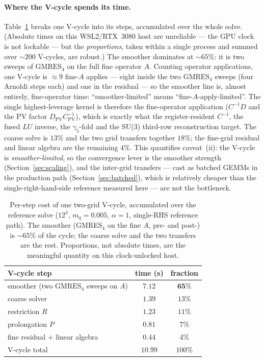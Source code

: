 \documentclass[12pt,a4paper]{article}
\newcommand{\Ddw}{D}
\newcommand{\Dpv}{D_{\mathrm{PV}}}
\newcommand{\Cpvinv}{C_{\mathrm{PV}}^{-1}}
\newcommand{\Aop}{A}
\begin{document}
\paragraph{Where the V-cycle spends its time.}
Table~\ref{tab:vctime} breaks one V-cycle into its steps, accumulated over the
whole solve. (Absolute times on this WSL2/RTX~3080 host are unreliable --- the GPU
clock is not lockable --- but the \emph{proportions}, taken within a single
process and summed over ${\sim}200$ V-cycles, are robust.) The smoother dominates
at ${\sim}65\%$: it is two sweeps of $\mathrm{GMRES}_4$ on the full fine operator
$\Aop$. Counting operator applications, one V-cycle is ${\approx}9$ fine-$\Aop$
applies --- eight inside the two $\mathrm{GMRES}_4$ sweeps (four Arnoldi steps each)
and one in the residual --- so the smoother line is, almost entirely, fine-operator
time: ``smoother-limited'' means ``fine-$\Aop$-apply-limited''. The single
highest-leverage kernel is therefore the fine-operator application ($C^{-1}\Ddw$ and
the PV factor $\Dpv\Cpvinv$), which is exactly what the register-resident $C^{-1}$,
the fused $LU$ inverse, the $\gamma_5$-fold and the SU(3) third-row reconstruction
target. The coarse solve is $13\%$ and the two grid transfers together $18\%$; the
fine-grid residual and linear algebra are the remaining $4\%$. This quantifies
caveat~(ii): the V-cycle is \emph{smoother-limited}, so the convergence lever is
the smoother strength (Section~\ref{sec:scaling}), and the inter-grid transfers ---
cast as batched GEMMs in the production path (Section~\ref{sec:batched}), which is
relatively cheaper than the single-right-hand-side reference measured here --- are
not the bottleneck.

\begin{table}[h]
\centering
\begin{tabular}{lcc}
\toprule
V-cycle step & time (s) & fraction \\
\midrule
smoother (two $\mathrm{GMRES}_4$ sweeps on $\Aop$) & $7.12$ & $\mathbf{65\%}$ \\
coarse solver                                       & $1.39$ & $13\%$ \\
restriction $R$                                     & $1.23$ & $11\%$ \\
prolongation $P$                                    & $0.81$ & $7\%$ \\
fine residual $+$ linear algebra                    & $0.44$ & $4\%$ \\
\midrule
V-cycle total                                       & $10.99$ & $100\%$ \\
\bottomrule
\end{tabular}
\caption{Per-step cost of one two-grid V-cycle, accumulated over the reference
solve ($12^4$, $m_q=0.005$, $\alpha=1$, single-RHS reference path). The smoother
(GMRES$_4$ on the fine $\Aop$, pre- and post-) is ${\sim}65\%$ of the cycle; the
coarse solve and the two transfers are the rest. Proportions, not absolute times,
are the meaningful quantity on this clock-unlocked host.}
\label{tab:vctime}
\end{table}
\end{document}
